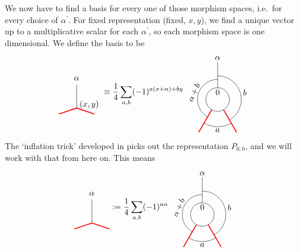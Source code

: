 We now have to find a basis for every one of those morphism spaces, i.e.\ for every choice of $\alpha^\prime$. For fixed representation (fixed, $x,y$), we find a unique vector up to a multiplicative scalar for each $\alpha^\prime$, so each morphism space is one dimensional. We define the basis to be
	\begin{equation}
		\begin{tikzpicture}[scale=1,baseline=(current bounding box.center)]
			\draw[red,line width=0.4mm] (0,-.25) -- (.75,0) -- (1.5,-.25);
			\draw (0.75,0) -- (0.75,1) node [pos=1.25] {$\alpha$};
			\node[above,right] at (.75,.15) {$(x,y)$};
		\end{tikzpicture}\equiv
		\frac{1}{4}
		\sum_{a,b}(-1)^{a(x+\alpha)+b y}
		\begin{tikzpicture}[scale=1,baseline=(current bounding box.center)]
		\draw (0,0) circle (0.5cm);
		\draw[red,line width=0.4mm]
		\foreach \a in {-60, -120} {
			(\a:0.5) -- (\a:1.6)
		};
		\draw ([shift=(-60:1cm)]0,0) arc (-60:90:1cm);
		\draw ([shift=(-120:1.15cm)]0,0) arc (-120:-60:1.15cm);
		\draw ([shift=(240:0.85cm)]0,0) arc (240:90:0.85cm);
		\draw[] (90:0.5) -- (90:1.6);
		\node at (90:.3cm){$0$};\node at (90:1.75cm){$\alpha$};
		\node[rotate=65] at (-1,0.3) {$\alpha+b$};
		\node at (1.15,0.3) {$b$};
		\node at (0,-1.3) {$a$};
		\end{tikzpicture}
	\end{equation}
The `inflation trick' developed in \cite{BBJ18,BB19a,BB19b} picks out the representation $P_{0,0}$, and we will work with that from here on. This means
	\begin{equation}
	\begin{tikzpicture}[scale=1,baseline=(current bounding box.center)]
	\draw[red,line width=0.4mm] (0,-.25) -- (.75,0) -- (1.5,-.25);
	\draw (0.75,0) -- (0.75,1) node [pos=1.25] {$\alpha$};
	\end{tikzpicture}:=
	\frac{1}{4}
	\sum_{a,b}(-1)^{a\alpha}
	\begin{tikzpicture}[scale=1,baseline=(current bounding box.center)]
	\draw (0,0) circle (0.5cm);
	\draw[red,line width=0.4mm]
	\foreach \a in {-60, -120} {
		(\a:0.5) -- (\a:1.6)
	};
	\draw ([shift=(-60:1cm)]0,0) arc (-60:90:1cm);
	\draw ([shift=(-120:1.15cm)]0,0) arc (-120:-60:1.15cm);
	\draw ([shift=(240:0.85cm)]0,0) arc (240:90:0.85cm);
	\draw[] (90:0.5) -- (90:1.6);
	\node at (90:.3cm){$0$};\node at (90:1.75cm){$\alpha$};
	\node[rotate=65] at (-1,0.3) {$\alpha+b$};
	\node at (1.15,0.3) {$b$};
	\node at (0,-1.3) {$a$};
	\end{tikzpicture}
	\end{equation}

